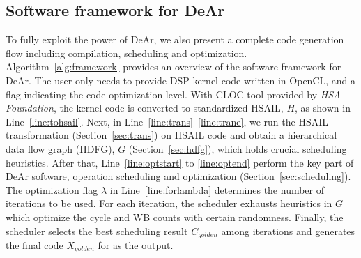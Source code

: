 \subsection{Software framework for DeAr}
\label{sec:swframework}
To fully exploit the power of DeAr, we also present a complete code generation flow including compilation, scheduling and optimization.
Algorithm~\ref{alg:framework} provides an overview of the software framework for DeAr. 
The user only needs to provide DSP kernel code written in OpenCL, and a flag indicating the code optimization level.
With CLOC \cite{cloc} tool provided by \textit{HSA Foundation}, the kernel code is converted to standardized HSAIL, $H$, as shown in Line~\ref{line:tohsail}.
Next, in Line~\ref{line:trans}--\ref{line:trane}, 
we run the HSAIL transformation (Section~\ref{sec:trans}) on HSAIL code and obtain a hierarchical data flow graph (HDFG), 
$\bar{G}$ (Section~\ref{sec:hdfg}), which holds crucial scheduling heuristics.
After that, Line~\ref{line:optstart} to \ref{line:optend} perform the key part of DeAr software, 
operation scheduling and optimization (Section~\ref{sec:scheduling}).
The optimization flag $\lambda$ in Line~\ref{line:forlambda} determines the number of iterations to be used.
For each iteration, the scheduler exhausts heuristics in $\bar{G}$ which optimize the cycle and WB counts with certain randomness.
Finally, the scheduler selects the best scheduling result $C_{golden}$ among iterations and generates the final code $X_{golden}$ for as the output.

